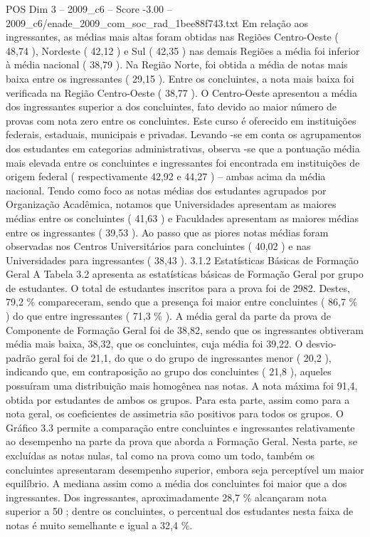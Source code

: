 \begin{textsample}{POS Dim 3 – 2009\_c6 – Score -3.00 – 2009\_c6/enade\_2009\_com\_soc\_rad\_1bee88f743.txt}
Em relação aos ingressantes, as médias mais altas foram obtidas nas Regiões Centro-Oeste ( 48,74 ), Nordeste ( 42,12 ) e Sul ( 42,35 ) nas demais Regiões a média foi inferior à média nacional ( 38,79 ).
Na Região Norte, foi obtida a média de notas mais baixa entre os ingressantes ( 29,15 ).
Entre os concluintes, a nota mais baixa foi verificada na Região Centro-Oeste ( 38,77 ).
O Centro-Oeste apresentou a média dos ingressantes superior a dos concluintes, fato devido ao maior número de provas com nota zero entre os concluintes.
Este curso é oferecido em instituições federais, estaduais, municipais e privadas.
Levando -se em conta os agrupamentos dos estudantes em categorias administrativas, observa -se que a pontuação média mais elevada entre os concluintes e ingressantes foi encontrada em instituições de origem federal ( respectivamente 42,92 e 44,27 ) – ambas acima da média nacional.
Tendo como foco as notas médias dos estudantes agrupados por Organização Acadêmica, notamos que Universidades apresentam as maiores médias entre os concluintes ( 41,63 ) e Faculdades apresentam as maiores médias entre os ingressantes ( 39,53 ).
Ao passo que as piores notas médias foram observadas nos Centros Universitários para concluintes ( 40,02 ) e nas Universidades para ingressantes ( 38,43 ). 3.1.2 Estatísticas Básicas de Formação Geral A Tabela 3.2 apresenta as estatísticas básicas de Formação Geral por grupo de estudantes.
O total de estudantes inscritos para a prova foi de 2982.
Destes, 79,2 \% compareceram, sendo que a presença foi maior entre concluintes ( 86,7 \% ) do que entre ingressantes ( 71,3 \% ).
A média geral da parte da prova de Componente de Formação Geral foi de 38,82, sendo que os ingressantes obtiveram média mais baixa, 38,32, que os concluintes, cuja média foi 39,22.
O desvio-padrão geral foi de 21,1, do que o do grupo de ingressantes menor ( 20,2 ), indicando que, em contraposição ao grupo dos concluintes ( 21,8 ), aqueles possuíram uma distribuição mais homogênea nas notas.
A nota máxima foi 91,4, obtida por estudantes de ambos os grupos.
Para esta parte, assim como para a nota geral, os coeficientes de assimetria são positivos para todos os grupos.
O Gráfico 3.3 permite a comparação entre concluintes e ingressantes relativamente ao desempenho na parte da prova que aborda a Formação Geral.
Nesta parte, se excluídas as notas nulas, tal como na prova como um todo, também os concluintes apresentaram desempenho superior, embora seja perceptível um maior equilíbrio.
A mediana assim como a média dos concluintes foi maior que a dos ingressantes.
Dos ingressantes, aproximadamente 28,7 \% alcançaram nota superior a 50 ; dentre os concluintes, o percentual dos estudantes nesta faixa de notas é muito semelhante e igual a 32,4 \%.

\end{textsample}
